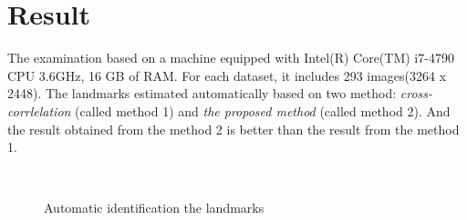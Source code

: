 \chapter{Result}
The examination based on a machine equipped with Intel(R) Core(TM) i7-4790 CPU 3.6GHz, 16 GB of RAM. For each dataset, it includes 293 images(3264 x 2448). 
The landmarks estimated automatically based on two method: \textit{cross-corrlelation} (called method 1) and \textit{the proposed method} (called method 2). And the result obtained from the method 2 is better than the result from the method 1.
\begin{figure}[h!]
\centering
{}~~
\caption{Automatic identification the landmarks}
\label{fig:figure_31}
\end{figure}